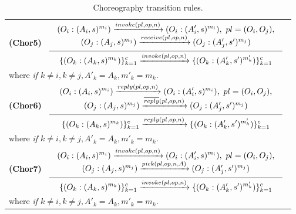 \begin{table}[!ht]
{{\begin{tabular}{l}

\\[0.7cm]

\hspace{0.6cm}\textbf{(Chor5)}
$\reglaa{ %
(O_i:(A_i,s)^{m_i}) \xrightarrow{invoke(pl,op,n)} (O_i:(A'_i,s)^{m_i}),\ pl=(O_i,O_j),\\
(O_j:(A_j,s)^{m_j}) \xrightarrow{receive(pl,op,n)} (O_j:(A'_j,s')^{m_j})
}
{ %
\{(O_k:(A_k,s)^{m_k})\}_{k=1}^c
\xrightarrow{invoke(pl,op,n)}
\{(O_k:(A'_k,s')^{m'_k})\}_{k=1}^c
}{10}$
\\[0.7cm]
\hspace{2.cm}where  \it{if} $k\neq i,k\neq j, A'_k=A_k,m'_k=m_k$.

\\[0.2cm]

\hspace{0.6cm}\textbf{(Chor6)}
$\reglaa{ %
(O_i:(A_i,s)^{m_i}) \xrightarrow{reply(pl,op,n)} (O_i:(A'_i,s)^{m_i}),\ pl=(O_i,O_j),\\
(O_j:(A_j,s)^{m_j}) \xrightarrow{\overline{reply}(pl,op,n)} (O_j:(A'_j,s')^{m_j})
}
{ %
\{(O_k:(A_k,s)^{m_k})\}_{k=1}^c
\xrightarrow{reply(pl,op,n)}
\{(O_k:(A'_k,s')^{m'_k})\}_{k=1}^c
}{10}$\\[0.7cm]
\hspace{2.cm}where  \it{if} $k\neq i,k\neq j, A'_k=A_k,m'_k=m_k$.

\\[0.2cm]

\hspace{0.6cm}\textbf{(Chor7)}
$\reglaa{ %
(O_i:(A_i,s)^{m_i}) \xrightarrow{invoke(pl,op,n)} (O_i:(A'_i,s)^{m_i}),\ pl=(O_i,O_j),\\
(O_j:(A_j,s)^{m_j}) \xrightarrow{pick(pl,op,n,A)} (O_j:(A'_j,s')^{m_j})
}
{ %
\{(O_k:(A_k,s)^{m_k})\}_{k=1}^c
\xrightarrow{invoke(pl,op,n)}
\{(O_k:(A'_k,s')^{m'_k})\}_{k=1}^c
}{10}$\\[0.7cm]
\hspace{2.cm}where  \it{if} $k\neq i,k\neq j, A'_k=A_k,m'_k=m_k$.
\\[0.4cm]

\end{tabular}
}}
\caption{\label{tab:coreo}Choreography transition rules.}
\vspace{-0.7cm}
\end{table}




